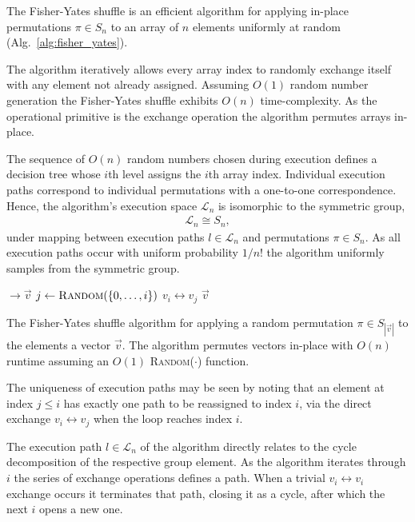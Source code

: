 \documentclass[twocolumn, aps, amsmath, amssymb, nofootinbib, superscriptaddress, longbibliography, floatfix, eqsecnum, rmp]{revtex4-2}
\let\oldalgorithmic\algorithmic
\let\endoldalgorithmic\endalgorithmic
\renewenvironment{algorithmic}
{\begin{adjustwidth}{-1em}{}\oldalgorithmic}
{\endoldalgorithmic\end{adjustwidth}}
\begin{document}
The Fisher-Yates shuffle \cite{FisherYates53} is an efficient algorithm for applying in-place permutations $\pi\in S_n$ to an array of $n$ elements uniformly at random (Alg.~\ref{alg:fisher_yates}).

The algorithm iteratively allows every array index to randomly exchange itself with any element not already assigned. Assuming $O(1)$ random number generation the Fisher-Yates shuffle exhibits $O(n)$ time-complexity. As the operational primitive is the exchange operation the algorithm permutes arrays in-place.

The sequence of $O(n)$ random numbers chosen during execution defines a decision tree whose $i$th level assigns the $i$th array index. Individual execution paths correspond to individual permutations with a one-to-one correspondence. Hence, the algorithm's execution space $\mathcal{L}_n$ is isomorphic to the symmetric group,
\begin{align}
	\mathcal{L}_n \cong S_n,
\end{align}
under mapping between execution paths \mbox{$l\in\mathcal{L}_n$} and permutations \mbox{$\pi\in S_n$}. As all execution paths occur with uniform probability $1/n!$ the algorithm uniformly samples from the symmetric group.

\begin{algorithm}[H]
\begin{algorithmic}
 $\to \vec{v}$ 
	 
		\State $j \gets \textsc{Random}(\{0,\dots,i\})$ 
		\State $v_i\leftrightarrow v_j$ 
	\EndFor
	\State \Return $\vec{v}$
\EndFunction
\end{algorithmic}	
\caption{\cite{FisherYates53} The Fisher-Yates shuffle algorithm for applying a random permutation $\pi\in S_{|\vec{v}|}$ to the elements a vector $\vec{v}$. The algorithm permutes  vectors in-place with $O(n)$ runtime assuming an $O(1)$ \textsc{Random}($\cdot$) function.}\label{alg:fisher_yates}
\end{algorithm}

The uniqueness of execution paths may be seen by noting that an element at index $j\leq i$ has  exactly one path to be reassigned to index $i$, via the direct exchange $v_i\leftrightarrow v_j$ when the loop reaches index $i$.

The execution path $l\in\mathcal{L}_n$ of the algorithm directly relates to the cycle decomposition of the respective group element. As the algorithm iterates through $i$ the series of exchange operations defines a path. When a trivial $v_i\leftrightarrow v_i$ exchange occurs it terminates that path, closing it as a cycle, after which the next $i$ opens a new one.
\end{document}
